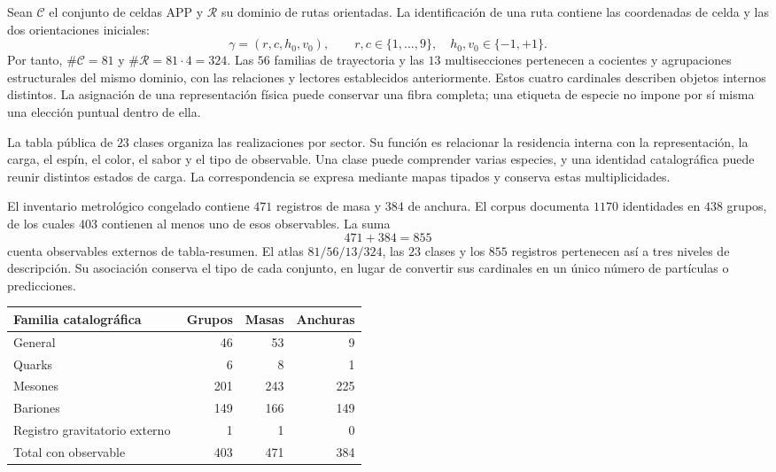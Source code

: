 Sean \(\mathcal C\) el conjunto de celdas APP y \(\mathcal R\) su dominio
de rutas orientadas. La identificación de una ruta contiene las coordenadas
de celda y las dos orientaciones iniciales:
\[
 \gamma=(r,c,h_0,v_0),\qquad
 r,c\in\{1,\ldots,9\},\quad h_0,v_0\in\{-1,+1\}.
\]
Por tanto, \(\#\mathcal C=81\) y \(\#\mathcal R=81\cdot4=324\).
Las \(56\) familias de trayectoria y las \(13\) multisecciones pertenecen
a cocientes y agrupaciones estructurales del mismo dominio, con las
relaciones y lectores establecidos anteriormente. Estos cuatro cardinales
describen objetos internos distintos. La asignación de una representación
física puede conservar una fibra completa; una etiqueta de especie no
impone por sí misma una elección puntual dentro de ella.

La tabla pública de \(23\) clases organiza las realizaciones por sector.
Su función es relacionar la residencia interna con la representación, la
carga, el espín, el color, el sabor y el tipo de observable. Una clase puede
comprender varias especies, y una identidad catalográfica puede reunir
distintos estados de carga. La correspondencia se expresa mediante mapas
tipados y conserva estas multiplicidades.

El inventario metrológico congelado contiene \(471\) registros de masa y
\(384\) de anchura. El corpus documenta \(1170\) identidades en \(438\)
grupos, de los cuales \(403\) contienen al menos uno de esos observables.
La suma
\[
 471+384=855
\]
cuenta observables externos de tabla-resumen. El atlas \(81/56/13/324\),
las \(23\) clases y los \(855\) registros pertenecen así a tres niveles
de descripción. Su asociación conserva el tipo de cada conjunto, en lugar
de convertir sus cardinales en un único número de partículas o predicciones.

\begin{center}
\begin{tabular}{p{0.49\linewidth}rrr}
\toprule
Familia catalográfica & Grupos & Masas & Anchuras\\
\midrule
General & 46 & 53 & 9\\
Quarks & 6 & 8 & 1\\
Mesones & 201 & 243 & 225\\
Bariones & 149 & 166 & 149\\
Registro gravitatorio externo & 1 & 1 & 0\\
\midrule
Total con observable & 403 & 471 & 384\\
\bottomrule
\end{tabular}
\end{center}

